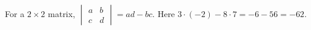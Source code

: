 For a $2\times2$ matrix, $\begin{vmatrix}a&b\\c&d\end{vmatrix}=ad-bc$. Here $3\cdot(-2)-8\cdot7=-6-56=\boxed{-62}$.
